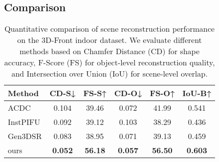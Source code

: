 \subsection{Comparison}


\begin{table}[]
\centering
\caption{Quantitative comparison of scene reconstruction performance on the 3D-Front indoor dataset. We evaluate different methods based on Chamfer Distance (CD) for shape accuracy, F-Score (FS) for object-level reconstruction quality, and Intersection over Union (IoU) for scene-level overlap. }
\label{tab:performance_comparison_3Dfront}
\begin{tabular}{lccccc}
\toprule
\textbf{Method} & CD-S↓ & FS-S↑ & CD-O↓ & FS-O↑ & IoU-B↑ \\
\midrule
ACDC  & 0.104 & 39.46 & 0.072 & 41.99 & 0.541\\
InstPIFU  & 0.092 & 39.12 & 0.103 & 38.29 & 0.436\\
Gen3DSR  & 0.083 & 38.95 & 0.071 & 39.13 & 0.459 \\
ours      & \textbf{0.052} & \textbf{56.18} & \textbf{0.057} & \textbf{56.50} & \textbf{0.603} \\
\bottomrule
\end{tabular}
\end{table}



